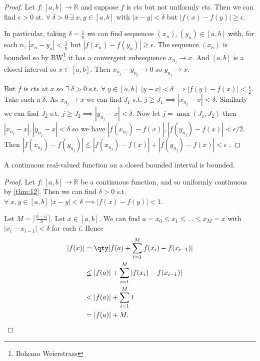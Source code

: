 \begin{proof}
    Let $f: [a, b] \to \mathbb{R}$ and suppose $f$ is cts but not uniformly cts. Then we can find $\epsilon > 0$ st. $\forall \; \delta > 0 \ \exists \; x,y \in [a, b]$ with $|x-y| < \delta$ but $|f(x) - f(y)| \geq \epsilon$.

    In particular, taking $\delta = \frac{1}{n}$ we can find sequences $(x_n), (y_n) \in [a, b]$ with, for each $n$, $|x_n - y_n| < \frac{1}{n}$ but $|f(x_n) - f(y_n)| \geq \epsilon$.
    The sequence $(x_n)$ is bounded so by BW\footnote{Bolzano Weierstrass} it has a convergent subsequence $x_{n_j} \to x$.
    And $[a, b]$ is a closed interval so $x \in [a, b]$.
    Then $x_{n_j} - y_{n_j} \to 0$ so $y_{n_j} \to x$.

    But $f$ is cts at $x$ so $\exists \; \delta > 0$ s.t. $\forall \; y \in [a, b]$ $|y-x| < \delta \implies |f(y) - f(x)| < \frac{\epsilon}{2}$. 
    Take such a $\delta$.
    As $x_{n_j} \to x$ we can find $J_1$ s.t. $j \geq J_1 \implies |x_{n_j} - x| < \delta$.
    Similarly we can find $J_2$ s.t. $j \geq J_2 \implies |y_{n_j} - x| < \delta$.
    Now let $j = \max (J_1, J_2)$ then $|x_{n_j} - x|, |y_{n_j} - x| < \delta$ so we have $|f(x_{n_j}) - f(x)|, |f(y_{n_j}) - f(x)| < \epsilon / 2$.
    Then $|f(x_{n_j}) - f(y_{n_j})| \leq |f(x_{n_j}) - f(x)| + |f(y_{n_j}) - f(x)| < \epsilon$ \Lightning.
\end{proof} 

\begin{corollary} \label{cor:13}
    A continuous real-valued function on a closed bounded interval is bounded.
\end{corollary} 

\begin{proof}
    Let $f:[a, b] \to \mathbb{R}$ be a continuous function, and so uniformly continuous by \cref{thm:12}.
    Then we can find $\delta > 0$ s.t. $\forall \; x, y \in [a, b] \ |x - y| < \delta \implies |f(x) - f(y)| < 1$.

    Let $M = \lceil \frac{b - a}{\delta} \rceil$.
    Let $x \in [a, b]$.
    We can find $a = x_0 \leq x_1 \leq \dots \leq x_M = x$ with $|x_i - x_{i - 1}| < \delta$ for each $i$.
    Hence
    \begin{align*}
        |f(x)| &= \qty| f(a) + \sum_{i=1}^{M} f(x_i) - f(x_{i - 1}) |\\
        &\leq |f(a)| + \sum_{i=1}^{M} |f(x_i) - f(x_{i-1})| \\
        &< |f(a)| + \sum_{i=1}^{M} 1 \\
        &= |f(a)| + M.
    \end{align*} 
\end{proof}

